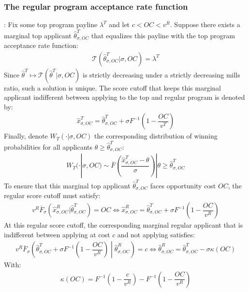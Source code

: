 \documentclass[12pt,reqno]{amsart}
\theoremstyle{definition}
\theoremstyle{plain} %
\begin{document}
\subsubsection{The regular program acceptance rate function}: Fix some top program payline $\lambda^T$ and let $c<OC<v^R$. Suppose there exists a marginal top applicant $\hat{\theta}^T_{\sigma,OC}$ that equalizes this payline with the top program acceptance rate function:
\begin{align}\label{eq:induced_toptype}
  \mathcal{T}(\hat{\theta}^T_{\sigma,OC}|\sigma,OC) = \lambda^T
\end{align}
Since $\hat{\theta}^T\mapsto \mathcal{T}(\hat{\theta}^T|\sigma,OC)$ is strictly decreasing under a strictly decreasing mills ratio, such a solution is unique. The score cutoff that keeps this marginal applicant indifferent between applying to the top and regular program is denoted by:
\begin{align}\label{eq:top_score_cutoff}
  \hat{x}^T_{\sigma,OC} = \hat{\theta}^T_{\sigma,OC} + \sigma F^{-1}\left(1 - \dfrac{OC}{v^T}\right)
\end{align}
Finally, denote $W_T(\cdot|\sigma,OC)$ the corresponding distribution of winning probabilities for all applicants $\theta\geq \hat{\theta}^T_{\sigma,OC}$:
\begin{align}\label{eq:top_winning_distribution}
  W_T(\cdot|\sigma,OC)\sim \bar{F}\left(\dfrac{\hat{x}^T_{\sigma,OC} - \theta}{\sigma}\right)|\theta\geq \hat{\theta}^T_{\sigma,OC}
\end{align}
To ensure that this marginal top applicant $\hat{\theta}^T_{\sigma,OC}$ faces opportunity cost $OC$, the regular score cutoff must satisfy:
\begin{align}\label{eq:reg_score_cutoff}
  v^R\bar{F}_{\sigma}(\hat{x}^R_{\sigma,OC}|\hat{\theta}^T_{\sigma,OC}) = OC \Longleftrightarrow \hat{x}^R_{\sigma,OC} = \hat{\theta}^T_{\sigma,OC} + \sigma F^{-1}\left(1 - \dfrac{OC}{v^R}\right)
\end{align}
At this regular score cutoff, the corresponding marginal regular applicant that is indifferent between applying at cost $c$ and not applying satisfies:
\begin{align}\label{eq:induced_regtype}
  v^R \bar{F}_{\sigma}\left(\hat{\theta}^T_{\sigma,OC} + \sigma F^{-1}\left(1 - \dfrac{OC}{v^R}\right)\middle |\hat{\theta}^R_{\sigma,OC}\right) = c \Longleftrightarrow \hat{\theta}^R_{\sigma,OC} = \hat{\theta}^T_{\sigma,OC} - \sigma\kappa(OC)
\end{align}
With:
\begin{align*}
  \kappa(OC) = F^{-1}\left(1-\dfrac{c}{v^R}\right) - F^{-1}\left(1-\dfrac{OC}{v^R}\right)
\end{align*}
\end{document}
